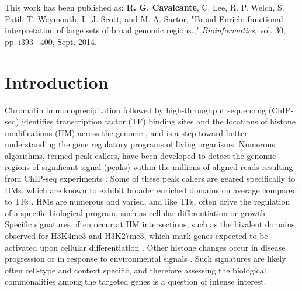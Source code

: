 \noindent This work has been published as: \textbf{R. G. Cavalcante}, C. Lee, R. P. Welch, S. Patil, T. Weymouth, L. J. Scott, and M. A. Sartor, "Broad-Enrich: functional interpretation of large sets of broad genomic regions.," \emph{Bioinformatics}, vol. 30, pp. i393–-400, Sept. 2014.

\section{Introduction}
\label{broadenrich_introduction}

Chromatin immunoprecipitation followed by high-throughput sequencing (ChIP-seq) identifies transcription factor (TF) binding sites and the locations of histone modifications (HM) across the genome \cite{Barski:2007gh}, and is a step toward better understanding the gene regulatory programs of living organisms. Numerous algorithms, termed peak callers, have been developed to detect the genomic regions of significant signal (peaks) within the millions of aligned reads resulting from ChIP-seq experiments \cite{Valouev:2008ev, Zhang:2008gm, Bailey:2013ie}. Some of these peak callers are geared specifically to HMs, which are known to exhibit broader enriched domains on average compared to TFs \cite{Zang:2009ht}. HMs are numerous and varied, and like TFs, often drive the regulation of a specific biological program, such as cellular differentiation \cite{Sen:2008gx} or growth \cite{Bernstein:2006ip}. Specific signatures often occur at HM intersections, such as the bivalent domains observed for H3K4me3 and H3K27me3, which mark genes expected to be activated upon cellular differentiation \cite{Bernstein:2006ip, Pan:2007ey}. Other histone changes occur in disease progression \cite{Chi:2010bd} or in response to environmental signals \cite{Kaelin:2013kp}. Such signatures are likely often cell-type and context specific, and therefore assessing the biological commonalities among the targeted genes is a question of intense interest.

